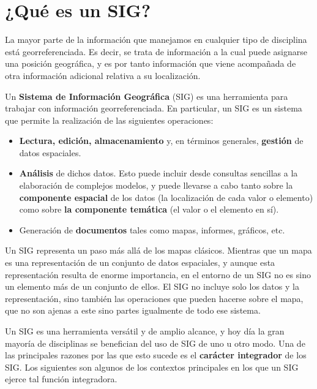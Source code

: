 
\chapter{¿Qué es un SIG?}

\pagestyle{fancy}

La mayor parte de la información que manejamos en cualquier tipo de disciplina está georreferenciada. Es decir, se trata de información a la cual puede asignarse una posición geográfica, y es por tanto información que viene acompañada de otra información adicional relativa a su localización. 

Un \textbf{Sistema de Información Geográfica} (SIG) es una herramienta para trabajar con información georreferenciada. En particular, un SIG es un sistema que permite la realización de las siguientes operaciones:

\begin{itemize}
	\item \textbf{Lectura, edición, almacenamiento} y, en términos generales, \textbf{gestión} de datos espaciales.
	\item \textbf{Análisis} de dichos datos. Esto puede incluir desde consultas sencillas a la elaboración de complejos modelos, y puede llevarse a cabo tanto sobre la \textbf{componente espacial} de los datos (la localización de cada valor o elemento) como sobre \textbf{la componente temática} (el valor o el elemento en sí).
	\item Generación de \textbf{documentos} tales como mapas, informes, gráficos, etc.
\end{itemize}


Un SIG representa un paso más allá de los mapas clásicos. Mientras que un mapa es una representación de un conjunto de datos espaciales, y aunque esta representación resulta de enorme importancia, en el entorno de un SIG no es sino un elemento más de un conjunto de ellos. El SIG no incluye solo los datos y la representación, sino también las operaciones que pueden hacerse sobre el mapa, que no son ajenas a este sino partes igualmente de todo ese sistema.

Un SIG es una herramienta versátil y de amplio alcance, y hoy día la gran mayoría de disciplinas se benefician del uso de SIG de uno u otro modo. Una de las principales razones por las que esto sucede es el \textbf{carácter integrador} de los SIG. Los siguientes son algunos de los contextos principales en los que un SIG ejerce tal función integradora.

